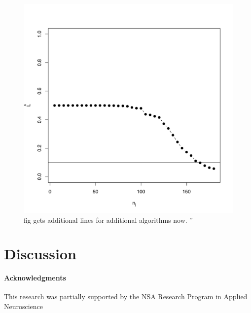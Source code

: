 % 

\begin{figure}[h!]
\centering 
\includegraphics[width=.5\linewidth]{Lhatplot}
\caption{fig gets additional lines for additional algorithms now.  %
˝}
\label{fig1}
\end{figure}



\section{Discussion} %
\label{sec:discussion}

\paragraph{Acknowledgments}

This research was partially supported by the NSA Research Program in Applied Neuroscience


\appendix
% 


%

%


